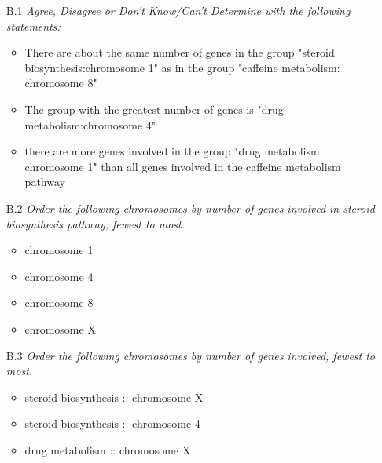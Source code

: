 \begin{itemize}
\item[B.1]\emph{Agree, Disagree or Don't Know/Can't Determine with the following statements:}
\begin{itemize}
\item There are about the same number of genes in the group "steroid biosynthesis:chromosome 1" as in the group "caffeine metabolism: chromosome 8"
\item The group with the greatest number of genes is "drug metabolism:chromosome 4"
\item there are more genes involved in the group "drug metabolism: chromosome 1" than all genes involved in the caffeine metabolism pathway
\end{itemize}

\item[B.2]\emph{Order the following chromosomes by number of genes involved in steroid biosynthesis pathway, fewest to most.}
\begin{itemize}
\item chromosome 1
\item chromosome 4
\item chromosome 8 
\item chromosome X
\end{itemize}

\item[B.3]\emph{Order the following chromosomes by number of genes involved, fewest to most.}
\begin{itemize}
\item steroid biosynthesis :: chromosome X
\item steroid biosynthesis :: chromosome 4
\item drug metabolism :: chromosome X
\end{itemize} 
\end{itemize} 


